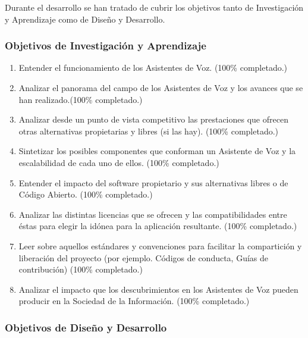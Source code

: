 Durante el desarrollo se han tratado de cubrir los objetivos tanto de Investigación y Aprendizaje como de Diseño y Desarrollo.

\subsubsection{Objetivos de Investigación y Aprendizaje}

\begin{enumerate}[O-{IA}.1 -]
	\item Entender el funcionamiento de los Asistentes de Voz. (100\% completado.)
	\item Analizar el panorama del campo de los Asistentes de Voz y los avances que se han realizado.(100\% completado.)
	\item Analizar desde un punto de vista competitivo las prestaciones que ofrecen otras alternativas propietarias y libres (si las hay). (100\% completado.)
	\item Sintetizar los posibles componentes que conforman un Asistente de Voz y la escalabilidad de cada uno de ellos. (100\% completado.)
	\item Entender el impacto del software propietario y sus alternativas libres o de Código Abierto. (100\% completado.)
	\item Analizar las distintas licencias que se ofrecen y las compatibilidades entre éstas para elegir la idónea para la aplicación resultante. (100\% completado.)
	\item Leer sobre aquellos estándares y convenciones para facilitar la compartición y liberación del proyecto (por ejemplo. Códigos de conducta, Guías de contribución) (100\% completado.)
	\item Analizar el impacto que los descubrimientos en los Asistentes de Voz pueden producir en la Sociedad de la Información. (100\% completado.)
\end{enumerate}

\subsubsection{Objetivos de Diseño y Desarrollo}

